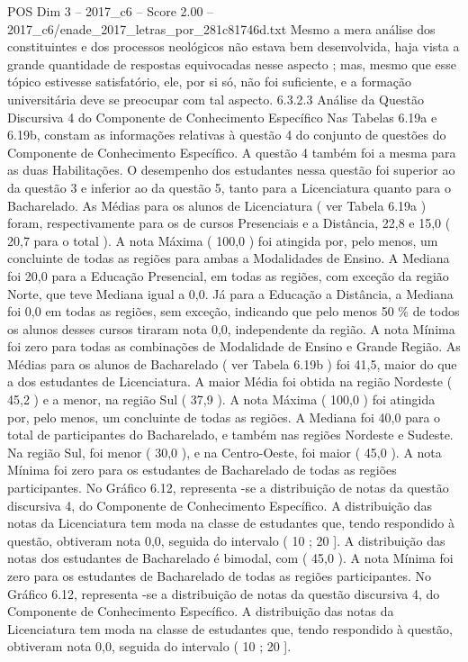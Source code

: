 \begin{textsample}{POS Dim 3 – 2017\_c6 – Score 2.00 – 2017\_c6/enade\_2017\_letras\_por\_281c81746d.txt}
Mesmo a mera análise dos constituintes e dos processos neológicos não estava bem desenvolvida, haja vista a grande quantidade de respostas equivocadas nesse aspecto ; mas, mesmo que esse tópico estivesse satisfatório, ele, por si só, não foi suficiente, e a formação universitária deve se preocupar com tal aspecto. 6.3.2.3 Análise da Questão Discursiva 4 do Componente de Conhecimento Específico Nas Tabelas 6.19a e 6.19b, constam as informações relativas à questão 4 do conjunto de questões do Componente de Conhecimento Específico.
A questão 4 também foi a mesma para as duas Habilitações.
O desempenho dos estudantes nessa questão foi superior ao da questão 3 e inferior ao da questão 5, tanto para a Licenciatura quanto para o Bacharelado.
As Médias para os alunos de Licenciatura ( ver Tabela 6.19a ) foram, respectivamente para os de cursos Presenciais e a Distância, 22,8 e 15,0 ( 20,7 para o total ).
A nota Máxima ( 100,0 ) foi atingida por, pelo menos, um concluinte de todas as regiões para ambas a Modalidades de Ensino.
A Mediana foi 20,0 para a Educação Presencial, em todas as regiões, com exceção da região Norte, que teve Mediana igual a 0,0.
Já para a Educação a Distância, a Mediana foi 0,0 em todas as regiões, sem exceção, indicando que pelo menos 50 \% de todos os alunos desses cursos tiraram nota 0,0, independente da região.
A nota Mínima foi zero para todas as combinações de Modalidade de Ensino e Grande Região.
As Médias para os alunos de Bacharelado ( ver Tabela 6.19b ) foi 41,5, maior do que a dos estudantes de Licenciatura.
A maior Média foi obtida na região Nordeste ( 45,2 ) e a menor, na região Sul ( 37,9 ).
A nota Máxima ( 100,0 ) foi atingida por, pelo menos, um concluinte de todas as regiões.
A Mediana foi 40,0 para o total de participantes do Bacharelado, e também nas regiões Nordeste e Sudeste.
Na região Sul, foi menor ( 30,0 ), e na Centro-Oeste, foi maior ( 45,0 ).
A nota Mínima foi zero para os estudantes de Bacharelado de todas as regiões participantes.
No Gráfico 6.12, representa -se a distribuição de notas da questão discursiva 4, do Componente de Conhecimento Específico.
A distribuição das notas da Licenciatura tem moda na classe de estudantes que, tendo respondido à questão, obtiveram nota 0,0, seguida do intervalo ( 10 ; 20 ].
A distribuição das notas dos estudantes de Bacharelado é bimodal, com ( 45,0 ).
A nota Mínima foi zero para os estudantes de Bacharelado de todas as regiões participantes.
No Gráfico 6.12, representa -se a distribuição de notas da questão discursiva 4, do Componente de Conhecimento Específico.
A distribuição das notas da Licenciatura tem moda na classe de estudantes que, tendo respondido à questão, obtiveram nota 0,0, seguida do intervalo ( 10 ; 20 ].

\end{textsample}
